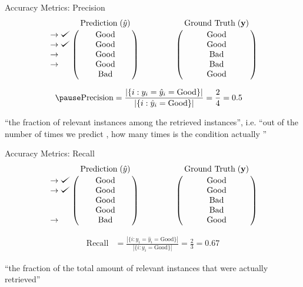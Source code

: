 \documentclass[usenames,dvipsnames]{beamer}
\begin{document}
\begin{frame}{Accuracy Metrics: Precision}
$$
\bordermatrix{&\text{Prediction}\;(\hat{y})\cr
               \rightarrow\checkmark&\text{Good}\cr
               \rightarrow\checkmark&\text{Good}\cr
                \rightarrow&\text{Good}\cr
                \rightarrow&\text{Good}\cr
               &\text{Bad}}
\qquad \qquad
\bordermatrix{&\text{Ground Truth}\;(\vy)\cr
                &\text{Good}\cr
                &\text{Good}\cr
                &\text{Bad}\cr
                &\text{Bad}\cr
                &\text{Good}}
$$

\begin{align*}
\pause \text{Precision} &= \frac{|\{i : y_i = \hat{y}_i = \text{Good}\}|}{|\{i : \hat{y}_i = \text{Good}\}|} = \frac{2}{4} = 0.5
\end{align*}

``the fraction of relevant instances among the retrieved instances'', i.e. ``out of the number of times we predict , how many times is the condition actually ''

\end{frame}

\begin{frame}{Accuracy Metrics: Recall}
$$
\bordermatrix{&\text{Prediction}\;(\hat{y})\cr
               \rightarrow\checkmark&\text{Good}\cr
               \rightarrow\checkmark&\text{Good}\cr
                &\text{Good}\cr
                &\text{Good}\cr
               \rightarrow&\text{Bad}}
\qquad \qquad
\bordermatrix{&\text{Ground Truth}\;(\vy)\cr
                &\text{Good}\cr
                &\text{Good}\cr
                &\text{Bad}\cr
                &\text{Bad}\cr
                &\text{Good}}
$$

\begin{align*}
\text{Recall} &= \frac{|\{i : y_i = \hat{y}_i = \text{Good}\}|}{|\{i : y_i = \text{Good}\}|} = \frac{2}{3} = 0.67
\end{align*}

``the fraction of the total amount of relevant instances that were actually retrieved''

\end{frame}
\end{document}
